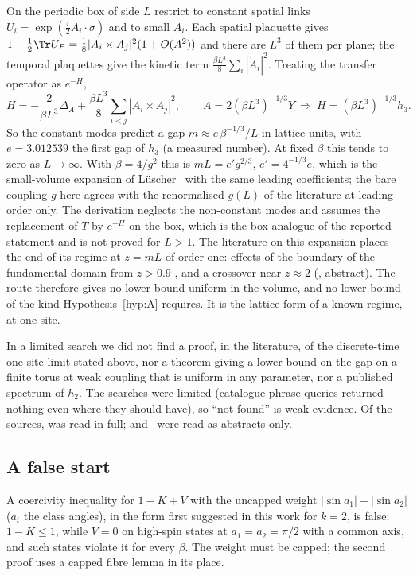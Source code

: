 On the periodic box of side $L$ restrict to constant spatial links $U_i=\exp(\tfrac{i}{2}A_i\cdot\sigma)$
and to small $A_i$. Each spatial plaquette gives $1-\tfrac12\Tr U_P=\tfrac18|A_i\times A_j|^2(1+O(A^2))$ and
there are $L^3$ of them per plane; the temporal plaquettes give the kinetic term
$\tfrac{\beta L^3}{8}\sum_i|\dot A_i|^2$. Treating the transfer operator as $e^{-H}$,
\[
H=-\frac{2}{\beta L^3}\Delta_A+\frac{\beta L^3}{8}\sum_{i<j}|A_i\times A_j|^2,
\qquad A=2(\beta L^3)^{-1/3}Y \ \Longrightarrow\ H=(\beta L^3)^{-1/3}h_3 .
\]
So the constant modes predict a gap $m\approx e\,\beta^{-1/3}/L$ in lattice units, with $e=3.012539$ the
first gap of $h_3$ (a measured number). At fixed $\beta$ this tends to zero as $L\to\infty$.
With $\beta=4/g^2$ this is $mL=e'g^{2/3}$, $e'=4^{-1/3}e$, which is the small-volume expansion of
L\"uscher~\cite{Lu83} with the same leading coefficients; the bare coupling $g$ here agrees with the
renormalised $g(L)$ of the literature at leading order only. The derivation neglects the non-constant
modes and assumes the replacement of $T$ by $e^{-H}$ on the box, which is the box analogue of the reported
statement and is not proved for $L>1$.
The literature on this expansion places the end of its regime at $z=mL$ of order one: effects of the
boundary of the fundamental domain from $z>0.9$ \cite[pp.~11--12]{vB00}, and a crossover near $z\approx2$
(\cite{LM84}, abstract). The route therefore gives no lower bound uniform in the volume, and no lower bound
of the kind Hypothesis~\ref{hyp:A} requires. It is the lattice form of a known regime, at one site.

In a limited search we did not find a proof, in the literature, of the discrete-time one-site limit stated
above, nor a theorem giving a lower bound on the gap on a finite torus at weak coupling that is uniform in
any parameter, nor a published spectrum of $h_2$. The searches were limited (catalogue phrase queries
returned nothing even where they should have), so ``not found'' is weak evidence.
Of the sources, \cite{vB00} was read in full; \cite{Lu83} and~\cite{LM84} were read as abstracts only.

\subsection{A false start}
A coercivity inequality for $1-K+V$ with the uncapped weight $|\sin a_1|+|\sin a_2|$ ($a_i$ the class
angles), in the form first suggested in this work for $k=2$, is false: $1-K\le1$, while $V=0$ on high-spin
states at $a_1=a_2=\pi/2$ with a common axis, and such states violate it for every $\beta$. The weight must be
capped; the second proof uses a capped fibre lemma in its place.

